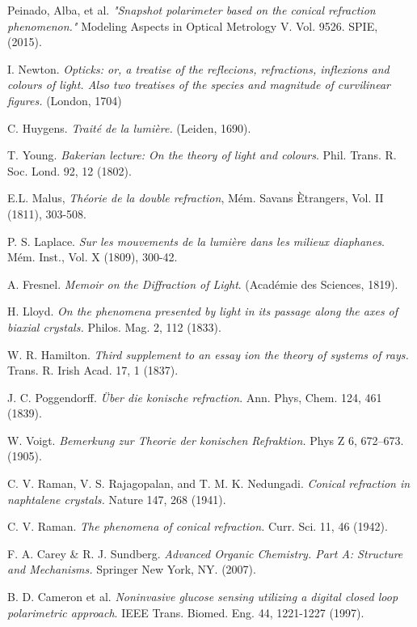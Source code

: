 \documentclass[11pt, a4paper, twoside]{article} %
\begin{document}
\begin{thebibliography}{1}
{
Peinado, Alba, et al. {\em "Snapshot polarimeter based on the conical refraction phenomenon."} Modeling Aspects in Optical Metrology V. Vol. 9526. SPIE, (2015).

I. Newton. {\em Opticks: or, a treatise of the reflecions, refractions, inflexions and colours of light. Also two treatises of the species and magnitude of curvilinear figures.} (London, 1704)

C. Huygens. {\em Traité de la lumière.} (Leiden, 1690).

T. Young. {\em Bakerian lecture: On the theory of light and colours}. Phil. Trans. R. Soc. Lond. 92, 12 (1802).

E.L. Malus, {\em Théorie de la double refraction}, Mém. Savans Ètrangers, Vol. II (1811), 303-508.
 
P. S. Laplace. {\em Sur les mouvements de la lumière dans les milieux diaphanes}. Mém. Inst., Vol. X (1809), 300-42.

A. Fresnel. {\em Memoir on the Diffraction of Light}. (Académie des Sciences, 1819).


H. Lloyd. {\em  On the phenomena presented by light in its passage along the axes of biaxial crystals.} Philos. Mag. 2, 112 (1833).

W. R. Hamilton. {\em Third supplement to an essay ion the theory of systems of rays.} Trans. R. Irish Acad. 17, 1 (1837).

J. C. Poggendorff. {\em Über die konische refraction}. Ann. Phys, Chem. 124, 461 (1839).

W. Voigt. {\em Bemerkung zur Theorie der konischen Refraktion.} Phys Z 6, 672–673. (1905).

C. V. Raman, V. S. Rajagopalan, and T. M. K. Nedungadi. {\em Conical refraction in naphtalene crystals.} Nature 147, 268 (1941).

C. V. Raman. {\em The phenomena of conical refraction.} Curr. Sci. 11, 46 (1942).

F. A. Carey \& R. J. Sundberg. {\em Advanced Organic Chemistry. Part A: Structure and Mechanisms.} Springer New York, NY. (2007).

B. D. Cameron et al. {\em Noninvasive glucose sensing utilizing a digital closed loop polarimetric approach}. IEEE Trans. Biomed. Eng. 44, 1221-1227 (1997).

}
\end{thebibliography}
\end{document}
